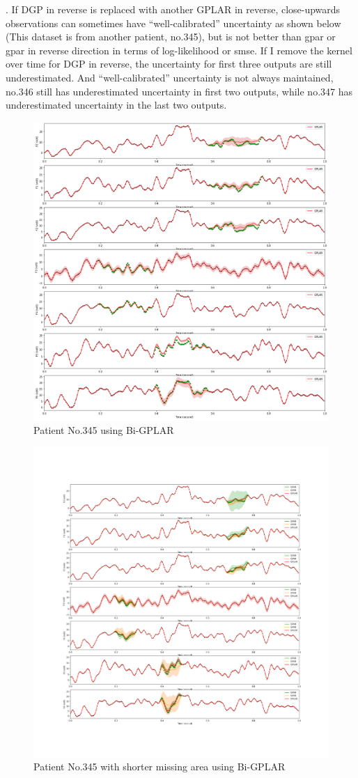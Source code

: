 \documentclass{article}
\begin{document}
. If DGP in reverse is replaced with another GPLAR in reverse, close-upwards observations can sometimes have ``well-calibrated'' uncertainty as shown below (This dataset is from another patient, no.345), but is not better than gpar or gpar in reverse direction in terms of log-likelihood or smse. If I remove the kernel over time for DGP in reverse, the uncertainty for first three outputs are still underestimated. And ``well-calibrated'' uncertainty is not always maintained, no.346 still has underestimated uncertainty in first two outputs, while no.347 has underestimated uncertainty in the last two outputs. 

\begin{figure}[H]
\centering
\includegraphics[width=.8\linewidth]{345-eeg-bi-gplar.png}
\caption{Patient No.345 using Bi-GPLAR}
\end{figure}


\begin{figure}[H]
\centering
\includegraphics[width=.8\linewidth]{345-eeg-bi-gplar-shorter.png}
\caption{Patient No.345 with shorter missing area using Bi-GPLAR}
\end{figure}
\end{document}
